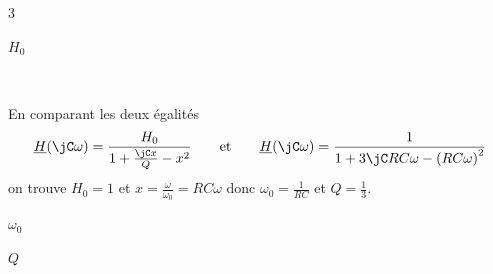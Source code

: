 \enlargethispage{1cm}
\hauteurLargeurCadreReponse		{7mm}{2cm}
\begin{multicols}{3}


\begin{enonce}
	$H_0$
\end{enonce}
\

\begin{corrige}
	En comparant les deux égalités
\[
	\underline{H}(\jC \omega) =\frac{H_0}{1+\frac{\jC x}{Q}-x^2} \qquad \text{et} \qquad
	\underline{H}(\jC \omega)= \frac{1}{ 1 + 3\jC RC \omega  - \left(RC \omega \right)^2 }
	\]
	on trouve $H_0 = 1 $ et $x = \frac{\omega}{\omega_0} = RC \omega$ donc $\omega_0 = \frac{1}{RC}$ et  $Q = \frac{1}{3}$.
\end{corrige}



\begin{enonce}
	$\omega_0$
\end{enonce}


%


\begin{enonce}
	$Q$
\end{enonce}


%

\end{multicols}

\finEntrainement


\newpage



